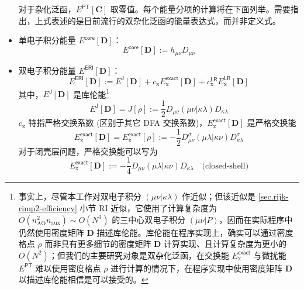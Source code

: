 \begin{itemize}[nosep]
\begin{equation}
        \end{equation}
        对于杂化泛函，$E^\textsf{PT} [\mathbf{C}]$ 取零值。每个能量分项的计算将在下面列举。需要指出，上式表述的是目前流行的双杂化泛函的能量表达式，而并非定义式。
  \item 单电子积分能量 $E^\textsf{core} [\mathbf{D}]$：
        \begin{equation}
          E^\textsf{core} [\mathbf{D}] := h_{\mu \nu} D_{\mu \nu}
        \end{equation}
  \item 双电子积分能量 $E^\textsf{ERI} [\mathbf{D}]$：
        \begin{equation}
          \label{eq.def.eng-eri}
          E^\textsf{ERI} [\mathbf{D}] := E^\textsf{J} [\mathbf{D}] + c_\mathrm{x} E_\mathrm{x}^\textsf{exact} [\mathbf{D}] + c_\mathrm{x}^\textsf{LR} E_\mathrm{x}^\textsf{LR} [\mathbf{D}]
        \end{equation}
        其中，$E^\textsf{J} [\mathbf{D}]$ 是库伦能\footnote{事实上，尽管本工作对双电子积分 $(\mu \nu | \kappa \lambda)$ 作近似；但该近似是 \ref{sec.rijk-rimp2-efficiency} 小节 RI 近似，它使用了计算复杂度为 $O(n_\mathrm{AO}^2 n_\mathrm{aux}) \sim O(N^3)$ 的三中心双电子积分 $(\mu \nu | P)$，因而在实际程序中仍然使用密度矩阵 $\mathbf{D}$ 描述库伦能。库伦能在程序实现上，确实可以通过密度格点 $\rho$ 而非具有更多细节的密度矩阵 $\mathbf{D}$ 计算实现、且计算复杂度为更小的 $O(N^2)$\cite{Toivanen-Sundholm.PCCP.2015}；但我们的主要研究对象是双杂化泛函，在交换能 $E_\mathrm{x}^\textsf{exact}$ 与微扰能 $E^\textsf{PT}$ 难以使用密度格点 $\rho$ 进行计算的情况下，在程序实现中使用密度矩阵 $\mathbf{D}$ 以描述库伦能相信是可以接受的。}
        \begin{equation}
          \label{eq.def.ej}
          E^\textsf{J} [\mathbf{D}] = J[\rho] := \frac{1}{2} D_{\mu \nu} (\mu \nu | \kappa \lambda) D_{\kappa \lambda}
        \end{equation}
        $c_\mathrm{x}$ 特指严格交换系数 (区别于其它 DFA 交换系数)，$E_\mathrm{x}^\textsf{exact} [\mathbf{D}]$ 是严格交换能
        \begin{equation}
          E_\mathrm{x}^\textsf{exact} [\mathbf{D}] = E_\mathrm{x}^\textsf{exact} [\rho] := - \frac{1}{2} D_{\mu \nu}^\sigma (\mu \lambda | \kappa \nu) D_{\kappa \lambda}^\sigma
        \end{equation}
        对于闭壳层问题，严格交换能可以写为
        \begin{equation}
          E_\mathrm{x}^\textsf{exact} [\mathbf{D}] := - \frac{1}{4} D_{\mu \nu} (\mu \lambda | \kappa \nu) D_{\kappa \lambda} \quad \text{(closed-shell)}

\end{equation}
\end{itemize}
